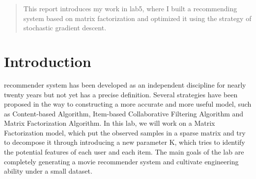 \documentclass[journal, a4paper]{IEEEtran}
\begin{document}
\begin{abstract}
This report introduces my work in lab5, where I built a recommending system based on matrix factorization and optimized it using the strategy of stochastic gradient descent.
\end{abstract}

\section{Introduction}
 recommender system has been developed as an independent discipline for nearly twenty years but not yet has a precise definition. Several strategies have been proposed in the way to constructing a more accurate and more useful model, such as Content-based Algorithm, Item-based Collaborative Filtering Algorithm and Matrix Factorization Algorithm. In this lab, we will work on a Matrix Factorization model, which put the observed samples in a sparse matrix and try to decompose it through introducing a new parameter K, which tries to identify the potential features of each user and each item. The main goals of the lab are completely generating a movie recommender system and cultivate engineering ability under a small dataset.

\end{document}
